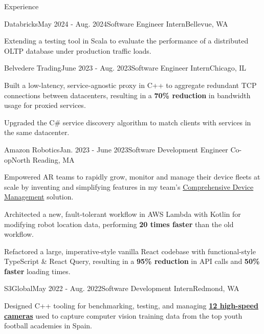 \documentclass{resume}
\begin{document}
  \vspace{-5pt}
  \begin{rSection}{Experience}

    \begin{rSubsection}{Databricks}{May 2024 - Aug. 2024}{Software Engineer Intern}{Bellevue, WA}
      \item Extending a testing tool in Scala to evaluate the performance of a distributed
      OLTP database under production traffic loads.
    \end{rSubsection}

    \begin{rSubsection}{Belvedere Trading}{June 2023 - Aug. 2023}{Software Engineer Intern}{Chicago, IL}
      \item Built a low-latency, service-agnostic proxy in C++ to aggregate redundant TCP
        connections between datacenters, resulting in a \textbf{70\% reduction} in bandwidth usage for proxied services.
      \item Upgraded the C\# service discovery algorithm to match clients with services in the same datacenter.
    \end{rSubsection}

    \begin{rSubsection}{Amazon Robotics}{Jan. 2023 - June 2023}{Software Development Engineer Co-op}{North Reading, MA}
      \item Empowered AR teams to rapidly grow, monitor and manage their device fleets at scale by inventing and simplifying
        features in my team's 
        \href{https://www.allthingsdistributed.com/2021/07/amazon-robotics-on-aws.html}{Comprehensive Device Management} solution. 
      \item Architected a new, fault-tolerant workflow in AWS Lambda with Kotlin for modifying 
        robot location data, performing \textbf{20 times faster} than the old workflow.
      \item Refactored a large, imperative-style vanilla React codebase with functional-style 
        TypeScript \& React Query, resulting in a \textbf{95\% reduction} in API calls and \textbf{50\% faster} loading times.
    \end{rSubsection}

    \begin{rSubsection}{S3Global}{May 2022 - Aug. 2022}{Software Development Intern}{Redmond, WA}
    \item Designed C++ tooling for benchmarking, testing, and managing 
      \textbf{\href{https://emergentvisiontec.com/}{12 high-speed cameras}} used to capture 
        computer vision training data from the top youth football academies in Spain.
    \end{rSubsection}

  \end{rSection}
\end{document}
